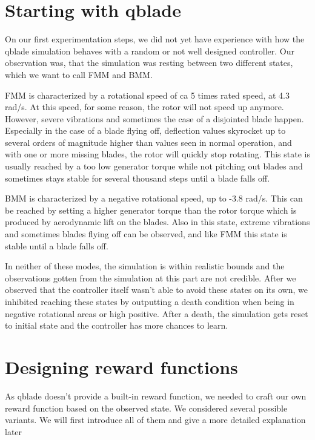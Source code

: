 \documentclass[hyperref,german,beleg]{cgvpub}
\begin{document}
\section{Starting with qblade}

On our first experimentation steps, we did not yet have experience with how the qblade simulation behaves with a random or not well designed controller. Our observation was, that the simulation was resting between two different states, which we want to call \ac{FMM} and \ac{BMM}.

\ac{FMM} is characterized by a rotational speed of ca 5 times rated speed, at 4.3 rad/s. At this speed, for some reason, the rotor will not speed up anymore. However, severe vibrations and sometimes the case of a disjointed blade happen. Especially in the case of a blade flying off, deflection values skyrocket up to several orders of magnitude higher than values seen in normal operation, and with one or more missing blades, the rotor will quickly stop rotating. This state is usually reached by a too low generator torque while not pitching out blades and sometimes stays stable for several thousand steps until a blade falls off.

\ac{BMM} is characterized by a negative rotational speed, up to -3.8 rad/s. This can be reached by setting a higher generator torque than the rotor torque which is produced by aerodynamic lift on the blades. Also in this state, extreme vibrations and sometimes blades flying off can be observed, and like \ac{FMM} this state is stable until a blade falls off. 

In neither of these modes, the simulation is within realistic bounds and the observations gotten from the simulation at this part are not credible. After we observed that the controller itself wasn't able to avoid these states on its own, we inhibited reaching these states by outputting a death condition when being in negative rotational areas or high positive. After a death, the simulation gets reset to initial state and the controller has more chances to learn.


\section{Designing reward functions}
\label{rewardfunctions}

As qblade doesn't provide a built-in reward function, we needed to craft our own reward function based on the observed state. We considered several possible variants. We will first introduce all of them and give a more detailed explanation later
\end{document}
